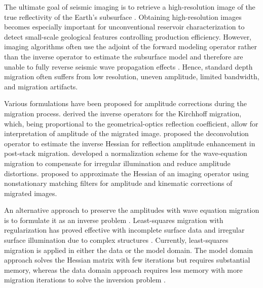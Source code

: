 \hspace{\parindent} The ultimate goal of seismic imaging is to retrieve a high-resolution image of the true reflectivity of the Earth's subsurface . Obtaining high-resolution images becomes especially important for unconventional reservoir characterization to detect small-scale geological features controlling production efficiency. However, imaging algorithms often use the adjoint of the forward modeling operator rather than the inverse operator to estimate the subsurface model and therefore are unable to fully reverse seismic wave propagation effects \cite[]{claerbout2001basic,rickett2003illumination,clapp2005imaging}. Hence, standard depth migration often suffers from low resolution, uneven amplitude, limited bandwidth, and migration artifacts.

Various formulations have been proposed for amplitude corrections during the migration process. \cite {bleistein1987imaging} derived the inverse operators for the Kirchhoff migration, which, being proportional to the geometrical-optics reflection coefficient, allow for interpretation of amplitude of the migrated image. \cite{hu2001poststack} proposed the deconvolution operator to estimate the inverse Hessian for reflection amplitude enhancement in post-stack migration. \cite{rickett2003illumination} developed a normalization scheme for the wave-equation migration to compensate for irregular illumination and reduce amplitude distortions. \cite{guitton2004amplitude,greer2018improving} proposed to approximate the Hessian of an imaging operator using nonstationary matching filters for amplitude and kinematic corrections of migrated images. 

An alternative approach to preserve the amplitudes with wave equation migration is to formulate it as an inverse problem . Least-squares migration with regularization has proved effective with incomplete surface data \cite[]{nemeth1999least} and irregular surface illumination due to complex structures \cite[]{prucha1999angle}. Currently, least-squares migration is applied in either the data or the model domain. The model domain approach solves the Hessian matrix with few iterations but requires substantial memory, whereas the data domain approach requires less memory with more migration iterations to solve the inversion problem \cite[]{wang2016least}. 

